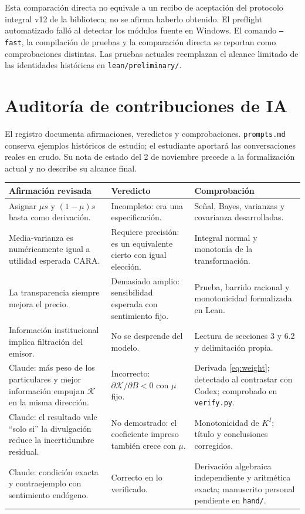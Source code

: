 \documentclass[11pt]{article}
\newcommand{\K}{\mathcal K}
\begin{document}
Esta comparación directa no equivale a un recibo de aceptación del protocolo
integral v12 de la biblioteca; no se afirma haberlo obtenido. El preflight
automatizado falló al detectar los módulos fuente en Windows. El comando
\texttt{--fast}, la compilación de pruebas y la comparación directa se
reportan como comprobaciones distintas. Las pruebas actuales reemplazan el
alcance limitado de las identidades históricas en \texttt{lean/preliminary/}.

\clearpage
\section{Auditoría de contribuciones de IA}
El registro documenta afirmaciones, veredictos y comprobaciones.
\texttt{prompts.md} conserva ejemplos históricos de estudio; el estudiante
aportará las conversaciones reales en crudo. Su nota de estado del 2 de
noviembre precede a la formalización actual y no describe su alcance final.
\begin{center}\small
\begin{tabular}{>{\raggedright\arraybackslash}p{4.2cm}>{\raggedright\arraybackslash}p{4.5cm}>{\raggedright\arraybackslash}p{4.3cm}}
\toprule
Afirmación revisada & Veredicto & Comprobación\\
\midrule
Asignar $\mu s$ y $(1-\mu)s$ basta como derivación.
& Incompleto: era una especificación.
& Señal, Bayes, varianzas y covarianza desarrolladas.\\
Media-varianza es numéricamente igual a utilidad esperada CARA.
& Requiere precisión: es un equivalente cierto con igual elección.
& Integral normal y monotonía de la transformación.\\
La transparencia siempre mejora el precio.
& Demasiado amplio: sensibilidad esperada con sentimiento fijo.
& Prueba, barrido racional y monotonicidad formalizada en Lean.\\
Información institucional implica filtración del emisor.
& No se desprende del modelo.
& Lectura de secciones 3 y 6.2 y delimitación propia.\\
Claude: más peso de los particulares y mejor información empujan $\K$ en
la misma dirección.
& Incorrecto: $\partial\K/\partial B<0$ con $\mu$ fijo.
& Derivada \eqref{eq:weight}; detectado al contrastar con Codex;
comprobado en \texttt{verify.py}.\\
Claude: el resultado vale ``solo si'' la divulgación reduce la
incertidumbre residual.
& No demostrado: el coeficiente impreso también crece con $\mu$.
& Monotonicidad de $K^I$; título y conclusiones corregidos.\\
Claude: condición exacta y contraejemplo con sentimiento endógeno.
& Correcto en lo verificado.
& Derivación algebraica independiente y aritmética exacta;
manuscrito personal pendiente en \texttt{hand/}.\\
\bottomrule
\end{tabular}
\end{center}
\end{document}
